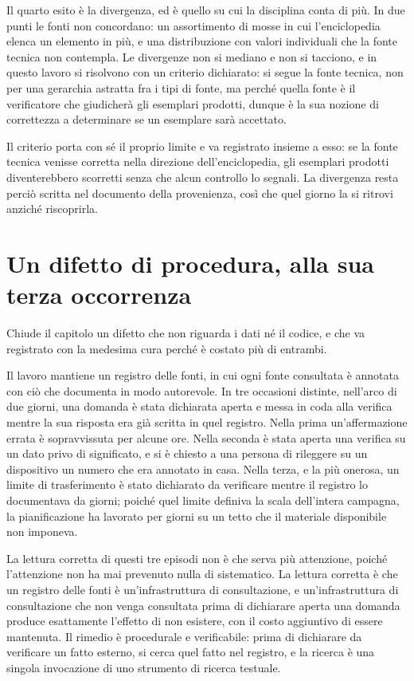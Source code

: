 Il quarto esito è la divergenza, ed è quello su cui la disciplina conta di più. In due punti le fonti non concordano: un assortimento di mosse in cui l'enciclopedia elenca un elemento in più, e una distribuzione con valori individuali che la fonte tecnica non contempla. Le divergenze non si mediano e non si tacciono, e in questo lavoro si risolvono con un criterio dichiarato: si segue la fonte tecnica, non per una gerarchia astratta fra i tipi di fonte, ma perché quella fonte è il verificatore che giudicherà gli esemplari prodotti, dunque è la sua nozione di correttezza a determinare se un esemplare sarà accettato.

Il criterio porta con sé il proprio limite e va registrato insieme a esso: se la fonte tecnica venisse corretta nella direzione dell'enciclopedia, gli esemplari prodotti diventerebbero scorretti senza che alcun controllo lo segnali. La divergenza resta perciò scritta nel documento della provenienza, così che quel giorno la si ritrovi anziché riscoprirla.

\section{Un difetto di procedura, alla sua terza occorrenza}

Chiude il capitolo un difetto che non riguarda i dati né il codice, e che va registrato con la medesima cura perché è costato più di entrambi.

Il lavoro mantiene un registro delle fonti, in cui ogni fonte consultata è annotata con ciò che documenta in modo autorevole. In tre occasioni distinte, nell'arco di due giorni, una domanda è stata dichiarata aperta e messa in coda alla verifica mentre la sua risposta era già scritta in quel registro. Nella prima un'affermazione errata è sopravvissuta per alcune ore. Nella seconda è stata aperta una verifica su un dato privo di significato, e si è chiesto a una persona di rileggere su un dispositivo un numero che era annotato in casa. Nella terza, e la più onerosa, un limite di trasferimento è stato dichiarato da verificare mentre il registro lo documentava da giorni; poiché quel limite definiva la scala dell'intera campagna, la pianificazione ha lavorato per giorni su un tetto che il materiale disponibile non imponeva.

La lettura corretta di questi tre episodi non è che serva più attenzione, poiché l'attenzione non ha mai prevenuto nulla di sistematico. La lettura corretta è che un registro delle fonti è un'infrastruttura di consultazione, e un'infrastruttura di consultazione che non venga consultata prima di dichiarare aperta una domanda produce esattamente l'effetto di non esistere, con il costo aggiuntivo di essere mantenuta. Il rimedio è procedurale e verificabile: prima di dichiarare da verificare un fatto esterno, si cerca quel fatto nel registro, e la ricerca è una singola invocazione di uno strumento di ricerca testuale.

